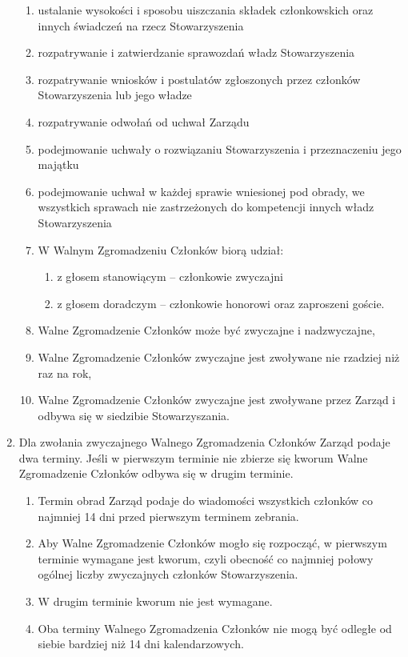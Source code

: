 \documentclass{article}
\begin{document}
\begin{enumerate}
\begin{enumerate}
        \item ustalanie wysokości i sposobu uiszczania składek członkowskich oraz innych świadczeń na rzecz Stowarzyszenia
        \item rozpatrywanie i zatwierdzanie sprawozdań władz Stowarzyszenia
        \item rozpatrywanie wniosków i postulatów zgłoszonych przez członków Stowarzyszenia lub jego władze
        \item rozpatrywanie odwołań od uchwał Zarządu
        \item podejmowanie uchwały o rozwiązaniu Stowarzyszenia i przeznaczeniu jego majątku
        \item podejmowanie uchwał w każdej sprawie wniesionej pod obrady, we wszystkich sprawach nie zastrzeżonych do kompetencji innych władz Stowarzyszenia
        \item W Walnym Zgromadzeniu Członków biorą udział:
          \begin{enumerate}
            \item z głosem stanowiącym – członkowie zwyczajni
            \item z głosem doradczym – członkowie honorowi oraz zaproszeni goście.
          \end{enumerate}
        \item Walne Zgromadzenie Członków może być zwyczajne i nadzwyczajne,
        \item Walne Zgromadzenie Członków zwyczajne jest zwoływane nie rzadziej niż raz na rok,
        \item Walne Zgromadzenie Członków zwyczajne jest zwoływane przez Zarząd i odbywa się w siedzibie Stowarzyszania.
      \end{enumerate}
    \item Dla zwołania zwyczajnego Walnego Zgromadzenia Członków Zarząd podaje dwa terminy. Jeśli w pierwszym terminie nie zbierze się kworum Walne Zgromadzenie Członków odbywa się w drugim terminie.
      \begin{enumerate}
        \item Termin obrad Zarząd podaje do wiadomości wszystkich członków co najmniej 14 dni przed pierwszym terminem zebrania.
        \item Aby Walne Zgromadzenie Członków mogło się rozpocząć, w pierwszym terminie wymagane jest kworum, czyli obecność co najmniej połowy ogólnej liczby zwyczajnych członków Stowarzyszenia.
        \item W drugim terminie kworum nie jest wymagane.
        \item Oba terminy Walnego Zgromadzenia Członków nie mogą być odległe od siebie bardziej niż 14 dni kalendarzowych.

\end{enumerate}
\end{enumerate}
\end{document}
